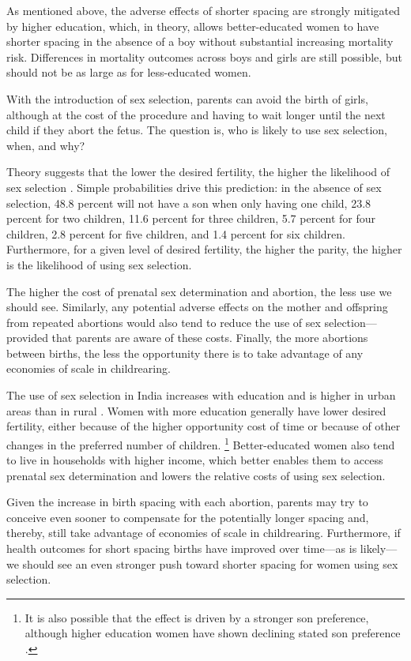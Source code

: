 As mentioned above, the adverse effects of shorter spacing are strongly mitigated 
by higher education, which, in theory, allows better-educated women to have shorter
spacing in the absence of a boy without substantial increasing mortality risk.
Differences in mortality outcomes across boys and girls are still possible,
but should not be as large as for less-educated women.

With the introduction of sex selection, parents can avoid the birth of girls, 
although at the cost of the procedure and having to wait longer until 
the next child if they abort the fetus.
The question is, who is likely to use sex selection, when, and why?

Theory suggests that the lower the desired fertility, the 
higher the likelihood of sex selection \citep{Portner2015b}.
Simple probabilities drive this prediction:
in the absence of sex selection, 
48.8 percent will not have a son when only having one child, 
23.8 percent for two children, 11.6 percent for three children, 
5.7 percent for four children, 2.8 percent for five children, 
and 1.4 percent for six children.
Furthermore, for a given level of desired fertility, the higher
the parity, the higher is the likelihood of using sex selection.

The higher the cost of prenatal sex determination and abortion,
the less use we should see.
Similarly, any potential adverse effects on the mother and offspring 
from repeated abortions would also tend to reduce the use of sex 
selection---provided that parents are aware of these costs.
Finally, the more abortions between births, the less the opportunity 
there is to take advantage of any economies of scale in childrearing.

The use of sex selection in India increases with education and is higher 
in urban areas than in rural
\citep{das_gupta97,retherford03b,jha06,Guilmoto2009a,Bongaarts2013,Portner2015b,
Jayachandran2017}.
Women with more education generally have lower desired fertility, either 
because of the higher opportunity cost of time or because of other changes 
in the preferred number of children.%
\footnote{
It is also possible that the effect is driven by a stronger son preference, although 
higher education women have shown declining stated son preference \citep{bhat03,pande07}.
}
Better-educated women also tend to live in households with higher 
income, which better enables them to access prenatal sex determination 
and lowers the relative costs of using sex selection.

Given the increase in birth spacing with each abortion, parents may try to 
conceive even sooner to compensate for the potentially longer spacing and, 
thereby, still take advantage of economies of scale in childrearing.
Furthermore, if health outcomes for short spacing births have improved over 
time---as is likely---we should see an even stronger push toward shorter 
spacing for women using sex selection.

